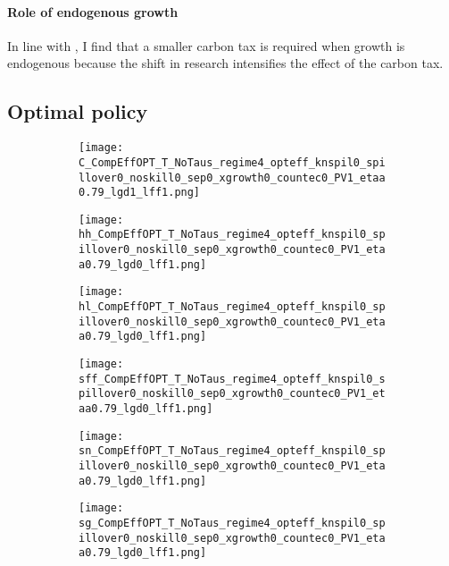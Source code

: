 \paragraph{Role of endogenous growth}
In line with \cite{Fried2018ClimateAnalysis}, I find that a smaller carbon tax is required when growth is endogenous because the shift in research intensifies the effect of the carbon tax.  



\subsection{Optimal policy}\label{app:quant_res_opt}


\begin{figure}[h!!]
	\centering
	\caption{Laissez-faire, optimal, and efficient allocation in levels }\label{fig:LF}	
	\begin{subfigure}[]{0.32\textwidth}
		\texttt{[image: C\_CompEffOPT\_T\_NoTaus\_regime4\_opteff\_knspil0\_spillover0\_noskill0\_sep0\_xgrowth0\_countec0\_PV1\_etaa0.79\_lgd1\_lff1.png]}
	\end{subfigure}	
	\begin{subfigure}[]{0.32\textwidth}
		\texttt{[image: hh\_CompEffOPT\_T\_NoTaus\_regime4\_opteff\_knspil0\_spillover0\_noskill0\_sep0\_xgrowth0\_countec0\_PV1\_etaa0.79\_lgd0\_lff1.png]}
	\end{subfigure}	
	\begin{subfigure}[]{0.32\textwidth}
		\texttt{[image: hl\_CompEffOPT\_T\_NoTaus\_regime4\_opteff\_knspil0\_spillover0\_noskill0\_sep0\_xgrowth0\_countec0\_PV1\_etaa0.79\_lgd0\_lff1.png]}
	\end{subfigure}		\begin{subfigure}[]{0.32\textwidth}
		\texttt{[image: sff\_CompEffOPT\_T\_NoTaus\_regime4\_opteff\_knspil0\_spillover0\_noskill0\_sep0\_xgrowth0\_countec0\_PV1\_etaa0.79\_lgd0\_lff1.png]}
	\end{subfigure}	
	\begin{subfigure}[]{0.32\textwidth}
		\texttt{[image: sn\_CompEffOPT\_T\_NoTaus\_regime4\_opteff\_knspil0\_spillover0\_noskill0\_sep0\_xgrowth0\_countec0\_PV1\_etaa0.79\_lgd0\_lff1.png]}
	\end{subfigure}	
	\begin{subfigure}[]{0.32\textwidth}
		\texttt{[image: sg\_CompEffOPT\_T\_NoTaus\_regime4\_opteff\_knspil0\_spillover0\_noskill0\_sep0\_xgrowth0\_countec0\_PV1\_etaa0.79\_lgd0\_lff1.png]}
	\end{subfigure}
\end{figure}

